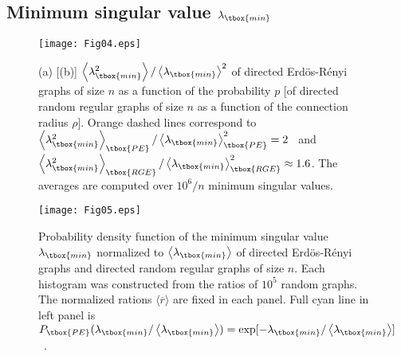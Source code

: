 \subsection{Minimum singular value $\lambda_{\tbox{min}}$}


\begin{figure}[ht]
\centering
\texttt{[image: Fig04.eps]}
\caption{(a) [(b)] 
$\left\langle \lambda_{\tbox{min}}^2 \right\rangle/\left\langle \lambda_{\tbox{min}} \right\rangle^2$ 
of directed Erd\"os-R\'enyi graphs of size $n$ as a function of the probability $p$
[of directed random regular graphs of size $n$ as a function of the connection radius $\rho$].
Orange dashed lines correspond to $\left\langle \lambda_{\tbox{min}}^2 \right\rangle_{\tbox{PE}}/\left\langle \lambda_{\tbox{min}} \right\rangle_{\tbox{PE}}^2=2$~\cite{KXOS23} and 
$\left\langle \lambda_{\tbox{min}}^2 \right\rangle_{\tbox{RGE}}/\left\langle \lambda_{\tbox{min}} \right\rangle_{\tbox{RGE}}^2\approx 1.6$.
The averages are computed over $10^6/n$ minimum singular values.}
\label{Fig04}
\end{figure}
\begin{figure*}[!t]
\texttt{[image: Fig05.eps]}
\caption{
Probability density function of the minimum singular value $\lambda_{\tbox{min}}$
normalized to $\left\langle \lambda_{\tbox{min}} \right\rangle$
of directed Erd\"os-R\'enyi graphs and directed random regular graphs of size $n$.
Each histogram was constructed from the ratios of $10^5$ random graphs.
The normalized rations $\langle \overline{r}\rangle$ are fixed in each panel.
Full cyan line in left panel is 
$P_{\tbox{PE}}(\lambda_{\tbox{min}}/\left\langle \lambda_{\tbox{min}} \right\rangle)=
\exp[-\lambda_{\tbox{min}}/\left\langle \lambda_{\tbox{min}} \right\rangle]$~\cite{KXOS23}.}
\label{Fig05}
\end{figure*} 


